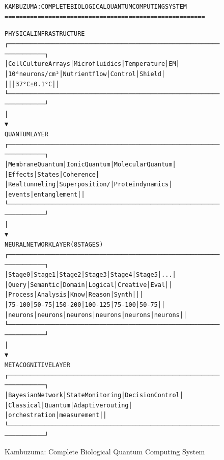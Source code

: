 \documentclass[11pt,a4paper]{article}
\newenvironment{asciiart}{\begin{alltt}}{\end{alltt}}
\begin{document}
\begin{figure}[H]
\centering
\begin{asciiart}
KAMBUZUMA: COMPLETE BIOLOGICAL QUANTUM COMPUTING SYSTEM
=======================================================

                            PHYSICAL INFRASTRUCTURE
    ┌─────────────────────────────────────────────────────────────────────┐
    │  Cell Culture Arrays  │  Microfluidics   │  Temperature   │  EM      │
    │  10⁶ neurons/cm²     │  Nutrient flow   │  Control       │  Shield  │
    │                      │                  │  37°C ± 0.1°C  │          │
    └─────────────────────────────────────────────────────────────────────┘
                                      │
                                      ▼
                               QUANTUM LAYER
    ┌─────────────────────────────────────────────────────────────────────┐
    │  Membrane Quantum    │  Ionic Quantum     │  Molecular Quantum      │
    │  Effects             │  States            │  Coherence              │
    │  Real tunneling      │  Superposition/    │  Protein dynamics       │
    │  events              │  entanglement      │                         │
    └─────────────────────────────────────────────────────────────────────┘
                                      │
                                      ▼
                          NEURAL NETWORK LAYER (8 STAGES)
    ┌─────────────────────────────────────────────────────────────────────┐
    │ Stage 0  │ Stage 1  │ Stage 2  │ Stage 3  │ Stage 4  │ Stage 5 │ ... │
    │ Query    │ Semantic │ Domain   │ Logical  │ Creative │ Eval    │     │
    │ Process  │ Analysis │ Know     │ Reason   │ Synth    │         │     │
    │ 75-100   │ 50-75    │ 150-200  │ 100-125  │ 75-100   │ 50-75   │     │
    │ neurons  │ neurons  │ neurons  │ neurons  │ neurons  │ neurons │     │
    └─────────────────────────────────────────────────────────────────────┘
                                      │
                                      ▼
                           METACOGNITIVE LAYER
    ┌─────────────────────────────────────────────────────────────────────┐
    │  Bayesian Network    │  State Monitoring   │  Decision Control      │
    │  Classical           │  Quantum            │  Adaptive routing      │
    │  orchestration       │  measurement        │                        │
    └─────────────────────────────────────────────────────────────────────┘
\end{asciiart}
\caption{Kambuzuma: Complete Biological Quantum Computing System}
\end{figure}
\end{document}

